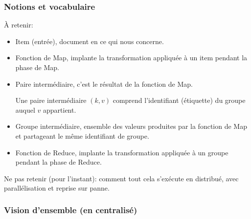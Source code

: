 \begin{frame}[fragile]
\frametitle{Notions et vocabulaire}

À retenir:

\begin{itemize}
  \item \alert{Item (entrée)}, \alert{document} en ce qui nous concerne.
  
  \item \alert{Fonction de Map}, implante la transformation appliquée à un item pendant la phase de Map.

  \item \alert{Paire intermédiaire}, c'est le résultat de la fonction de Map. 
  
  Une paire intermédiaire $(k, v)$ comprend l'identifiant (étiquette) du groupe auquel
  $v$ appartient.

  \item \alert{Groupe intermédiaire}, ensemble des valeurs produites par la fonction
  de Map et partageant le même identifiant de groupe.
  
    \item \alert{Fonction de Reduce}, implante la transformation appliquée à un groupe
    pendant la phase de Reduce.
    
\end{itemize}

\alert{Ne pas retenir (pour l'instant)}: comment tout cela s'exécute en distribué, avec
parallélisation et reprise sur panne.

\end{frame}


\begin{frame}[fragile]
\frametitle{Vision d'ensemble (en centralisé)}



\end{frame}



